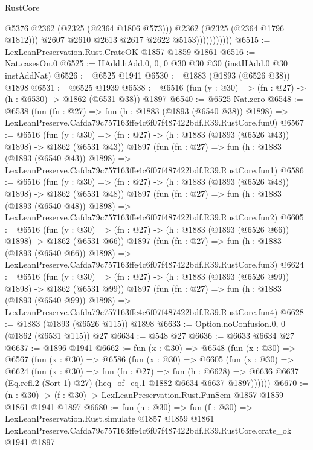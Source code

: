 \begin{lexlean}{RustCore}
\begin{coremodule}
                              @5376
                              @2362
                              (@2325 (@2364 @1806 @573)))
                            @2362
                            (@2325 (@2364 @1796 @1812)))
                          @2607
                          @2610
                          @2613
                          @2617
                          @2622
                          @5153)))))))))))
@6515 := LexLeanPreservation.Rust.CrateOK @1857 @1859 @1861
@6516 := Nat.casesOn.{0}
@6525 := HAdd.hAdd.{0, 0, 0} @30 @30 @30 (instHAdd.{0} @30 instAddNat)
@6526 := @6525 @1941
@6530 := @1883 (@1893 (@6526 @38)) @1898
@6531 := @6525 @1939
@6538 := @6516 (fun (y : @30) => (fn : @27) -> (h : @6530) -> @1862 (@6531 @38)) @1897
@6540 := @6525 Nat.zero
@6548 := @6538
    (fun (fn : @27) =>
    fun (h : @1883 (@1893 (@6540 @38)) @1898) =>
    LexLeanPreserve.Cafda79c757163ffe4c6f07f487422bdf.R39.RustCore.fun0)
@6567 := @6516
    (fun (y : @30) => (fn : @27) -> (h : @1883 (@1893 (@6526 @43)) @1898) -> @1862 (@6531 @43))
    @1897
    (fun (fn : @27) =>
    fun (h : @1883 (@1893 (@6540 @43)) @1898) =>
    LexLeanPreserve.Cafda79c757163ffe4c6f07f487422bdf.R39.RustCore.fun1)
@6586 := @6516
    (fun (y : @30) => (fn : @27) -> (h : @1883 (@1893 (@6526 @48)) @1898) -> @1862 (@6531 @48))
    @1897
    (fun (fn : @27) =>
    fun (h : @1883 (@1893 (@6540 @48)) @1898) =>
    LexLeanPreserve.Cafda79c757163ffe4c6f07f487422bdf.R39.RustCore.fun2)
@6605 := @6516
    (fun (y : @30) => (fn : @27) -> (h : @1883 (@1893 (@6526 @66)) @1898) -> @1862 (@6531 @66))
    @1897
    (fun (fn : @27) =>
    fun (h : @1883 (@1893 (@6540 @66)) @1898) =>
    LexLeanPreserve.Cafda79c757163ffe4c6f07f487422bdf.R39.RustCore.fun3)
@6624 := @6516
    (fun (y : @30) => (fn : @27) -> (h : @1883 (@1893 (@6526 @99)) @1898) -> @1862 (@6531 @99))
    @1897
    (fun (fn : @27) =>
    fun (h : @1883 (@1893 (@6540 @99)) @1898) =>
    LexLeanPreserve.Cafda79c757163ffe4c6f07f487422bdf.R39.RustCore.fun4)
@6628 := @1883 (@1893 (@6526 @115)) @1898
@6633 := Option.noConfusion.{0, 0} (@1862 (@6531 @115)) @27
@6634 := @548 @27
@6636 := @6633 @6634 @27
@6637 := @1896 @1941
@6662 := fun (x : @30) =>
  @6548
    (fun (x : @30) =>
    @6567
      (fun (x : @30) =>
      @6586
        (fun (x : @30) =>
        @6605
          (fun (x : @30) =>
          @6624
            (fun (x : @30) =>
            fun (fn : @27) =>
            fun (h : @6628) =>
            @6636 @6637 (Eq.refl.{2} (Sort 1) @27) (heq_of_eq.{1} @1882 @6634 @6637 @1897))))))
@6670 := (n : @30) -> (f : @30) -> LexLeanPreservation.Rust.FunSem @1857 @1859 @1861 @1941 @1897
@6680 := fun (n : @30) =>
  fun (f : @30) =>
  LexLeanPreservation.Rust.simulate
    @1857
    @1859
    @1861
    LexLeanPreserve.Cafda79c757163ffe4c6f07f487422bdf.R39.RustCore.crate_ok
    @1941
    @1897
\end{coremodule}
\end{lexlean}
